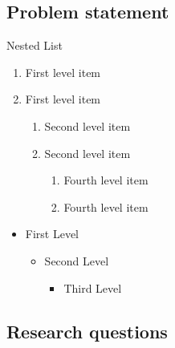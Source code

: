 \documentclass[xcolor=table]{beamer}
\begin{document}
\subsection{Problem statement}
\begin{frame}{Nested List}
    \begin{enumerate}
        \item First level item
        \item First level item
        \begin{enumerate}
          \item Second level item
          \item Second level item
          
            \begin{enumerate}
              \item Fourth level item
              \item Fourth level item
            \end{enumerate}
        \end{enumerate}
      \end{enumerate}
    
 \begin{itemize}
    \item  First Level
    \begin{itemize}
      \item  Second Level
      \begin{itemize}
        \item  Third Level
        
      \end{itemize}
    \end{itemize}
  \end{itemize}
\end{frame}
\subsection{Research questions}
\end{document}
